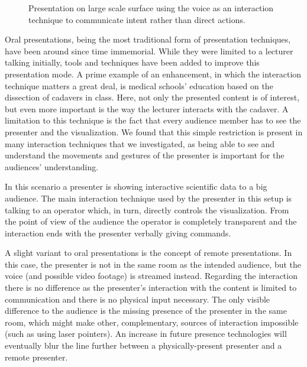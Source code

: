 \documentclass[review,journal]{vgtc}         %
\begin{document}
\begin{figure}[htb]
	\centering
	\caption{Presentation on large scale surface using the voice as an interaction technique to communicate intent rather than direct actions.}
	\label{img:dome_presentation}
\end{figure}

Oral presentations, being the most traditional form of presentation techniques, have been around since time immemorial.
While they were limited to a lecturer talking initially, tools and techniques have been added to improve this presentation mode.
A prime example of an enhancement, in which the interaction technique matters a great deal, is medical schools' education based on the dissection of cadavers in class.
Here, not only the presented content is of interest, but even more important is the way the lecturer interacts with the cadaver.
A limitation to this technique is the fact that every audience member has to see the presenter and the visualization.
We found that this simple restriction is present in many interaction techniques that we investigated, as being able to see and understand the movements and gestures of the presenter is important for the audiences' understanding.

In this scenario a presenter is showing interactive scientific data to a big audience.
The main interaction technique used by the presenter in this setup is talking to an operator which, in turn, directly controls the visualization.
From the point of view of the audience the operator is completely transparent and the interaction ends with the presenter verbally giving commands.

A slight variant to oral presentations is the concept of remote presentations.
In this case, the presenter is not in the same room as the intended audience, but the voice (and possible video footage) is streamed instead.
Regarding the interaction there is no difference as the presenter's interaction with the content is limited to communication and there is no physical input necessary.
The only visible difference to the audience is the missing presence of the presenter in the same room, which might make other, complementary, sources of interaction impossible (such as using laser pointers).
An increase in future presence technologies will eventually blur the line further between a physically-present presenter and a remote presenter.
\end{document}
